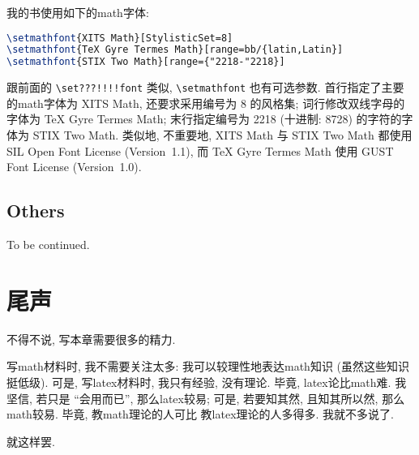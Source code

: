 我的书使用如下的\gls{math}字体:
\begin{lstlisting}[language=TeX]
\setmathfont{XITS Math}[StylisticSet=8]
\setmathfont{TeX Gyre Termes Math}[range=bb/{latin,Latin}]
\setmathfont{STIX Two Math}[range={"2218-"2218}]
\end{lstlisting}
跟前面的 \verb`\set???!!!!font` 类似,
\verb`\setmathfont` 也有可选参数.
首行指定了主要的\gls{math}字体为 XITS Math,
还要求采用编号为 8 的风格集;
词行修改双线字母的字体为 TeX Gyre Termes Math;
末行指定编号为 2218 (十进制: \num{8728})
的字符的字体为 STIX Two Math.
类似地, 不重要地,
XITS Math 与 STIX Two Math
都使用 SIL Open Font License (Version~1.1),
而 TeX Gyre Termes Math
使用 GUST Font License (Version~1.0).

\subsection{Others}

To be continued.

\section{尾声}

不得不说, 写本章需要很多的精力.

写\gls{math}材料时, 我不需要关注太多:
我可以较理性地表达\gls{math}知识
(虽然这些知识挺低级).
可是, 写\gls{latex}材料时, 我只有经验, 没有理论.
毕竟, \gls{latex}论比\gls{math}难.
我坚信, 若只是 ``会用而已'', 那么\gls{latex}较易;
可是, 若要知其然, 且知其所以然,
那么\gls{math}较易.
毕竟, 教\gls{math}理论的人可比%
教\gls{latex}理论的人多得多.
我就不多说了.

就这样罢.
